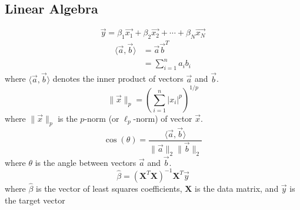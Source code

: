 \documentclass[nobib]{tufte-handout}
\begin{document}
\subsection{Linear Algebra}
\begin{equation}
    \vec{y} = \beta_1 \vec{x_1} + \beta_2 \vec{x_2} + \cdots + \beta_N \vec{x_N}
\end{equation}
\begin{align}
    \langle \vec{a}, \vec{b} \rangle & = \vec{a}\vec{b}^{T}     \\
                                     & = \sum_{i=1}^{n} a_i b_i
\end{align}
where $\langle \vec{a}, \vec{b} \rangle$ denotes the inner product of vectors $\vec{a}$ and $\vec{b}$.
\begin{equation}
    \|\vec{x}\|_p = \left( \sum_{i=1}^{n} |x_i|^p \right)^{1/p}
\end{equation}
where $\|\vec{x}\|_p$ is the $p$-norm (or $\ell_p$-norm) of vector $\vec{x}$.
\begin{equation}
    \cos(\theta) = \frac{\langle \vec{a}, \vec{b} \rangle}{\|\vec{a}\|_2 \|\vec{b}\|_2}
\end{equation}
where $\theta$ is the angle between vectors $\vec{a}$ and $\vec{b}$.
\begin{equation}
    \hat{\beta} = (\mathbf{X}^T \mathbf{X})^{-1} \mathbf{X}^T \vec{y}
\end{equation}
where $\hat{\beta}$ is the vector of least squares coefficients, $\mathbf{X}$ is the data matrix, and $\vec{y}$ is the target vector
\end{document}
